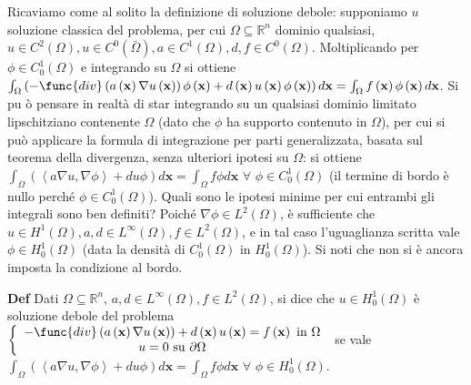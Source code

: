 \documentclass{article}
\begin{document}
Ricaviamo come al solito la definizione di soluzione debole: supponiamo $u$
soluzione classica del problema, per cui $\Omega \subseteq 
\mathbb{R}
^{n}$ dominio qualsiasi, $u\in C^{2}\left( \Omega \right) ,u\in C^{0}\left( 
\bar{\Omega}\right) ,a\in C^{1}\left( \Omega \right) ,d,f\in C^{0}\left(
\Omega \right) $. Moltiplicando per $\phi \in C_{0}^{1}\left( \Omega \right) 
$ e integrando su $\Omega $ si ottiene $\int_{\Omega }\left( -\func{div}%
\left( a\left( \mathbf{x}\right) \nabla u\left( \mathbf{x}\right) \right)
\phi \left( \mathbf{x}\right) +d\left( \mathbf{x}\right) u\left( \mathbf{x}%
\right) \phi \left( \mathbf{x}\right) \right) d\mathbf{x}=\int_{\Omega
}f\left( \mathbf{x}\right) \phi \left( \mathbf{x}\right) d\mathbf{x}$. Si pu%
\`{o} pensare in realt\`{a} di star integrando su un qualsiasi dominio
limitato lipschitziano contenente $\Omega $ (dato che $\phi $ ha supporto
contenuto in $\Omega $), per cui si pu\`{o} applicare la formula di
integrazione per parti generalizzata, basata sul teorema della divergenza,
senza ulteriori ipotesi su $\Omega $: si ottiene $\int_{\Omega }\left(
\left\langle a\nabla u,\nabla \phi \right\rangle +du\phi \right) d\mathbf{x}%
=\int_{\Omega }f\phi d\mathbf{x}$ $\forall $ $\phi \in C_{0}^{1}\left(
\Omega \right) $ (il termine di bordo \`{e} nullo perch\'{e} $\phi \in
C_{0}^{1}\left( \Omega \right) $). Quali sono le ipotesi minime per cui
entrambi gli integrali sono ben definiti? Poich\'{e} $\nabla \phi \in
L^{2}\left( \Omega \right) $, \`{e} sufficiente che $u\in H^{1}\left( \Omega
\right) ,a,d\in L^{\infty }\left( \Omega \right) ,f\in L^{2}\left( \Omega
\right) $, e in tal caso l'uguaglianza scritta vale $\phi \in
H_{0}^{1}\left( \Omega \right) $ (data la densit\`{a} di $C_{0}^{1}\left(
\Omega \right) $ in $H_{0}^{1}\left( \Omega \right) $). Si noti che non si 
\`{e} ancora imposta la condizione al bordo.

\textbf{Def} Dati $\Omega \subseteq 
\mathbb{R}
^{n}$, $a,d\in L^{\infty }\left( \Omega \right) ,f\in L^{2}\left( \Omega
\right) $, si dice che $u\in H_{0}^{1}\left( \Omega \right) $ \`{e}
soluzione debole del problema $\left\{ 
\begin{array}{c}
-\func{div}\left( a\left( \mathbf{x}\right) \nabla u\left( \mathbf{x}\right)
\right) +d\left( \mathbf{x}\right) u\left( \mathbf{x}\right) =f\left( 
\mathbf{x}\right) \text{ in }\Omega \\ 
u=0\text{ su }\partial \Omega%
\end{array}%
\right. $ se vale $\int_{\Omega }\left( \left\langle a\nabla u,\nabla \phi
\right\rangle +du\phi \right) d\mathbf{x}=\int_{\Omega }f\phi d\mathbf{x}$ $%
\forall $ $\phi \in H_{0}^{1}\left( \Omega \right) $.
\end{document}
